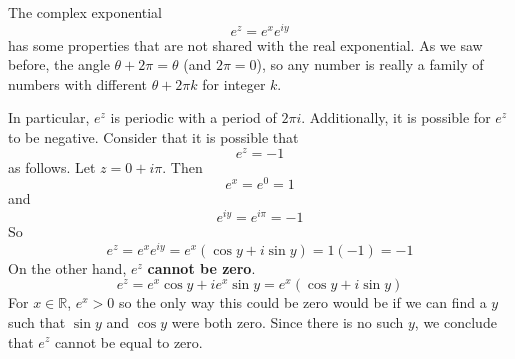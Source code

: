 \documentclass[11pt, oneside]{article}
\begin{document}
The complex exponential 
\[ e^z = e^x e^{iy} \]
has some properties that are not shared with the real exponential.  As we saw before, the angle $\theta + 2 \pi = \theta$ (and $2 \pi = 0$), so any number is really a family of numbers with different $\theta + 2 \pi k$ for integer $k$.

In particular, $e^z$ is periodic with a period of $2 \pi i$.  Additionally, it is possible for $e^z$ to be negative.  Consider that it is possible that
\[ e^z = -1 \]
as follows.  Let $z = 0 + i\pi$.  Then 
\[ e^x = e^0 = 1 \]
and
\[ e^{iy} = e^{i\pi} = -1 \]
So
\[ e^z = e^x e^{iy} = e^x(\cos y + i \sin y) = 1 (-1) = -1 \]
On the other hand, $e^z$ \textbf{cannot be zero}.
\[ e^z = e^x \cos y + i e^x \sin y = e^x(\cos y + i \sin y) \]
For $x \in \mathbb{R}$, $e^x > 0$ so the only way this could be zero would be if we can find a $y$ such that $\sin y$ and $\cos y$ were both zero.  Since there is no such $y$, we conclude that $e^z$ cannot be equal to zero.
\end{document}
